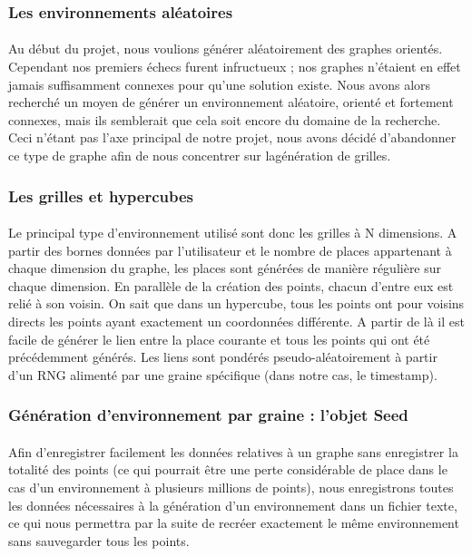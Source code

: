 \documentclass[pidr]{tnreport}
\begin{document}
			\subsubsection{Les environnements aléatoires}

\paragraph{}
Au début du projet, nous voulions générer aléatoirement des graphes orientés. Cependant nos premiers échecs furent infructueux ; nos graphes n'étaient en effet jamais suffisamment connexes pour qu'une solution existe. Nous avons alors recherché un moyen de générer un environnement aléatoire, orienté et fortement connexes, mais ils semblerait que cela soit encore du domaine de la recherche. Ceci n'étant pas l'axe principal de notre projet, nous avons décidé d'abandonner ce type de graphe afin de nous concentrer sur lagénération de grilles.
			
			\subsubsection{Les grilles et hypercubes}
		
\paragraph{}
Le principal type d'environnement utilisé sont donc les grilles à N dimensions. A partir des bornes données par l'utilisateur et le nombre de places appartenant à chaque dimension du graphe, les places sont générées de manière régulière sur chaque dimension. En parallèle de la création des points, chacun d'entre eux est relié à son voisin. On sait que dans un hypercube, tous les points ont pour voisins directs les points ayant exactement un coordonnées différente. A partir de là il est facile de générer le lien entre la place courante et tous les points qui ont été précédemment générés. \newline
Les liens sont pondérés pseudo-aléatoirement à partir d'un RNG alimenté par une graine spécifique (dans notre cas, le timestamp).
		
			\subsubsection{Génération d'environnement par graine : l'objet Seed}

\paragraph{}
Afin d'enregistrer facilement les données relatives à un graphe sans enregistrer la totalité des points (ce qui pourrait être une  perte considérable de place dans le cas d'un environnement à plusieurs millions de points), nous enregistrons toutes les données nécessaires à la génération d'un environnement dans un fichier texte, ce qui nous permettra par la suite de recréer exactement le même environnement sans sauvegarder tous les points. 
\end{document}
